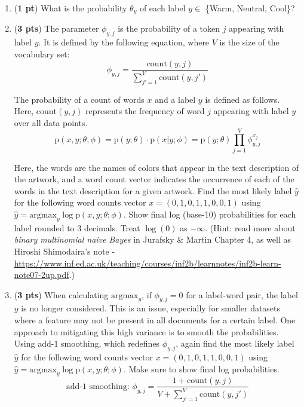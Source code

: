\documentclass[11pt, letterpaper]{article}
\begin{document}
    \begin{enumerate}[label=\alph*.]
        \item (\textbf{1 pt}) What is the probability $\theta_y$ of each label $y \in$ \{Warm, Neutral, Cool\}?\\
        
        \item (\textbf{3 pts}) The parameter $\phi_{y, j}$ is the probability of a token $j$ appearing with label $y$. It is defined by the following equation, where $V$ is the size of the vocabulary set:
        $$ \phi_{y, j} = \frac{\text{count}(y, j)}{\sum^V_{j'=1}\text{count}(y, j')}$$
        
        The probability of a count of words $x$ and a label $y$ is defined as follows. Here, $\text{count}(y, j)$ represents the frequency of word $j$ appearing with label $y$ over all data points. 
        $$ \mathrm{p}(x, y; \theta, \phi) = \mathrm{p}(y; \theta) \cdot \mathrm{p}(x|y; \phi) = \mathrm{p}(y; \theta)\prod^V_{j=1} \phi^{x_j}_{y, j} $$
        
        Here, the words are the names of colors that appear in the text description of the artwork, and a word count vector indicates the occurrence of each of the words in the text description for a given artwork. Find the most likely label $\hat y$ for the following word counts vector $x = (0,1,0,1,1,0,0,1)$ using $\hat y = \text{argmax}_y \log \mathrm{p}(x, y; \theta; \phi)$. Show final log (base-10) probabilities for each label rounded to 3 decimals. Treat $\log(0)$ as $-\infty$. (Hint: read more about \textit{binary multinomial naive Bayes} in Jurafsky & Martin Chapter 4, as well as Hiroshi Shimodaira's note - \url{https://www.inf.ed.ac.uk/teaching/courses/inf2b/learnnotes/inf2b-learn-note07-2up.pdf}.)
        
        \item (\textbf{3 pts}) When calculating $\text{argmax}_y$, if $\phi_{y, j} = 0$ for a label-word pair, the label $y$  is no longer considered. This is an issue, especially for smaller datasets where a feature may not be present in all documents for a certain label. One approach to mitigating this high variance is to smooth the probabilities. Using add-1 smoothing, which redefines $\phi_{y, j}$, again find the most likely label $\hat y$ for the following word counts vector $x = (0,1,0,1,1,0,0,1)$ using $\hat y = \text{argmax}_y \log \mathrm{p}(x, y; \theta; \phi)$. Make sure to show final log probabilities.\\
        $$\text{add-1 smoothing: } \phi_{y, j} = \frac{1 + \text{count}(y, j)}{V + \sum^V_{j'=1}\text{count}(y, j')}$$\\
    \end{enumerate}
    
\end{document}
